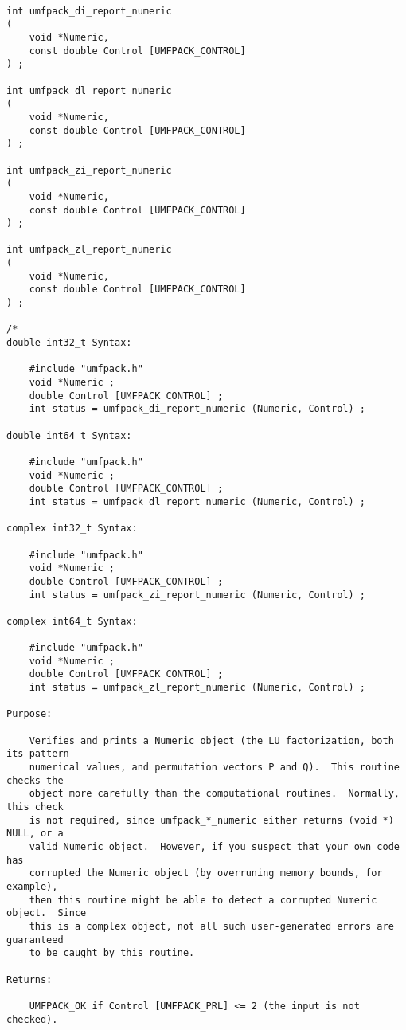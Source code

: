 \documentclass[11pt]{article}
\begin{document}
{\footnotesize
\begin{verbatim}

int umfpack_di_report_numeric
(
    void *Numeric,
    const double Control [UMFPACK_CONTROL]
) ;

int umfpack_dl_report_numeric
(
    void *Numeric,
    const double Control [UMFPACK_CONTROL]
) ;

int umfpack_zi_report_numeric
(
    void *Numeric,
    const double Control [UMFPACK_CONTROL]
) ;

int umfpack_zl_report_numeric
(
    void *Numeric,
    const double Control [UMFPACK_CONTROL]
) ;

/*
double int32_t Syntax:

    #include "umfpack.h"
    void *Numeric ;
    double Control [UMFPACK_CONTROL] ;
    int status = umfpack_di_report_numeric (Numeric, Control) ;

double int64_t Syntax:

    #include "umfpack.h"
    void *Numeric ;
    double Control [UMFPACK_CONTROL] ;
    int status = umfpack_dl_report_numeric (Numeric, Control) ;

complex int32_t Syntax:

    #include "umfpack.h"
    void *Numeric ;
    double Control [UMFPACK_CONTROL] ;
    int status = umfpack_zi_report_numeric (Numeric, Control) ;

complex int64_t Syntax:

    #include "umfpack.h"
    void *Numeric ;
    double Control [UMFPACK_CONTROL] ;
    int status = umfpack_zl_report_numeric (Numeric, Control) ;

Purpose:

    Verifies and prints a Numeric object (the LU factorization, both its pattern
    numerical values, and permutation vectors P and Q).  This routine checks the
    object more carefully than the computational routines.  Normally, this check
    is not required, since umfpack_*_numeric either returns (void *) NULL, or a
    valid Numeric object.  However, if you suspect that your own code has
    corrupted the Numeric object (by overruning memory bounds, for example),
    then this routine might be able to detect a corrupted Numeric object.  Since
    this is a complex object, not all such user-generated errors are guaranteed
    to be caught by this routine.

Returns:

    UMFPACK_OK if Control [UMFPACK_PRL] <= 2 (the input is not checked).


\end{verbatim}}
\end{document}

